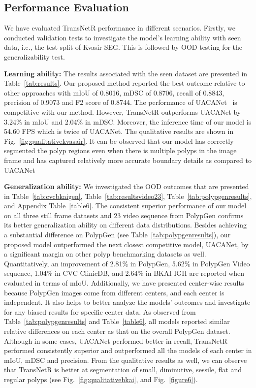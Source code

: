\documentclass{midl} \usepackage{mwe}
\begin{document}
\subsection{Performance Evaluation}
We have evaluated TransNetR performance in different scenarios. Firstly, we conducted validation tests to investigate the model's learning ability with seen data, i.e., the test split of Kvasir-SEG. This is followed by OOD testing for the generalizability test. 
\par \textbf{Learning ability:} The results associated with the seen dataset are presented in Table~\ref{tab:results}. Our proposed method reported the best outcome relative to other approaches with mIoU of 0.8016, mDSC of 0.8706, recall of 0.8843, precision of 0.9073 and F2 score of 0.8744. {The performance of UACANet~\cite{kim2021uacanet} is competitive with our method. However, TransNetR outperforms UACANet by 3.24\% in mIoU and 2.04\% in mDSC. Moreover, the inference time of our model is 54.60 FPS which is twice of UACANet. 
The qualitative results are shown in Fig.~\ref{fig:qualitativekvasair}. It can be observed that our model has correctly segmented the polyp regions even when there is multiple polyps in the image frame and has captured relatively more accurate boundary details as compared to UACANet}













\par \textbf{Generalization ability:} {We investigated the OOD outcomes that are presented in Table~\ref{tab:cvcbkaigen},  Table~\ref{tab:resultsvideo23}, Table~\ref{tab:polypgenresults}, and Appendix Table~\ref{table6}. The consistent superior performance of our model on all three still frame datasets and 23 video sequence from PolypGen confirms its better generalization ability on different data distributions}. Besides achieving a substantial difference on PolypGen (see Table~\ref{tab:polypgenresults}), our proposed model outperformed the next closest competitive model, {UACANet\cite{kim2021uacanet}, by a significant margin on other polyp benchmarking datasets as well. Quantitatively, an improvement of 2.81\% in PolypGen, 5.62\% in PolypGen Video sequence,  1.04\% in CVC-ClinicDB, and 2.64\% in BKAI-IGH are reported when evaluated in terms of mIoU}. Additionally, we have presented center-wise results because PolypGen images come from different centers, and each center is independent. It also helps to better analyze the models' outcomes and investigate for any biased results for specific center data. As observed from Table~\ref{tab:polypgenresults} and Table~\ref{table6}, all models reported similar relative differences on each center as that on the overall PolypGen dataset. Although in some cases, {UACANet performed better in recall,  TransNetR performed consistently superior and outperformed all the models of each center in mIoU, mDSC and precision. From the qualitative results as well, we can observe that TransNetR is better at segmentation of small, diminutive, sessile, flat and regular polyps (see Fig.~\ref{fig:qualitativebkai}, and Fig.~\ref{figure6})}. 
\end{document}

